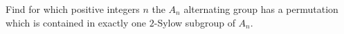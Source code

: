 Find for which positive integers $n$ the $A_n$ alternating group has a permutation which is contained in exactly one $2$-Sylow subgroup of $A_n$.

